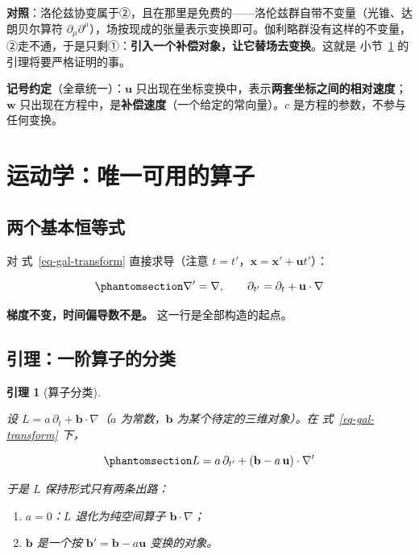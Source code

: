 \documentclass[
  chinese,
  a4paper,
  UTF8,
  12pt,
  oneside,
  openany]{ctexbook}
\providecommand{\tightlist}{%
  \setlength{\itemsep}{0pt}\setlength{\parskip}{0pt}}
\theoremstyle{plain}
\theoremstyle{plain}
\theoremstyle{plain}
\theoremstyle{definition}
\theoremstyle{plain}
\theoremstyle{plain}
\newtheorem{lemma}{引理}[chapter]
\theoremstyle{remark}
\begin{document}
\textbf{对照}：洛伦兹协变属于②，且在那里是免费的------洛伦兹群自带不变量（光锥、达朗贝尔算符
\(\partial_\mu\partial^\mu\)），场按现成的张量表示变换即可。伽利略群没有这样的不变量，②走不通，于是只剩①：\textbf{引入一个补偿对象，让它替场去变换}。这就是
小节~\ref{sec-gal-kinematics} 的引理将要严格证明的事。

\textbf{记号约定}（全章统一）：\(\mathbf{u}\)
只出现在坐标变换中，表示\textbf{两套坐标之间的相对速度}；\(\mathbf{w}\)
只出现在方程中，是\textbf{补偿速度}（一个给定的常向量）。\(c\)
是方程的参数，不参与任何变换。

\section{运动学：唯一可用的算子}\label{sec-gal-kinematics}

\subsection{两个基本恒等式}\label{ux4e24ux4e2aux57faux672cux6052ux7b49ux5f0f}

对 式~\ref{eq-gal-transform} 直接求导（注意
\(t=t'\)，\(\mathbf{x} = \mathbf{x}' + \mathbf{u}t'\)）：

\begin{equation}\protect\phantomsection\label{eq-operator-transform}{
\nabla' = \nabla,
\qquad
\partial_{t'} = \partial_{t} + \mathbf{u}\cdot\nabla
}\end{equation}

\textbf{梯度不变，时间偏导数不是。} 这一行是全部构造的起点。

\subsection{引理：一阶算子的分类}\label{ux5f15ux7406ux4e00ux9636ux7b97ux5b50ux7684ux5206ux7c7b}

\begin{lemma}[算子分类]\protect\hypertarget{lem-operator-classification}{}\label{lem-operator-classification}

设 \(L = a\,\partial_{t} + \mathbf{b}\cdot\nabla\)（\(a\)
为常数，\(\mathbf{b}\) 为某个待定的三维对象）。在
式~\ref{eq-gal-transform} 下，

\begin{equation}\protect\phantomsection\label{eq-lemma-L}{
L = a\,\partial_{t'} + \left(\mathbf{b} - a\,\mathbf{u}\right)\cdot\nabla'
}\end{equation}

于是 \(L\) 保持形式只有两条出路：

\begin{enumerate}
\def\labelenumi{\arabic{enumi}.}
\tightlist
\item
  \(a = 0\)：\(L\) 退化为纯空间算子 \(\mathbf{b}\cdot\nabla\)；
\item
  \(\mathbf{b}\) 是一个按 \(\mathbf{b}' = \mathbf{b} - a\mathbf{u}\)
  变换的对象。
\end{enumerate}

\end{lemma}
\end{document}
